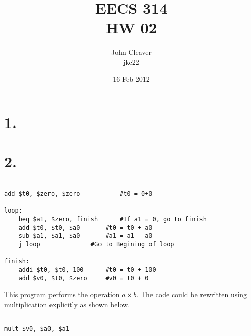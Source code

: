\documentclass[12pt]{article}
\title{EECS 314 \\ HW 02}
\author{John Cleaver \\ jkc22}
\date{16 Feb 2012}
\begin{document}
\lstset{language=[mips]Assembler}
\maketitle

\section*{1.}



\section*{2.}

\begin{lstlisting}

add $t0, $zero, $zero 			#t0 = 0+0

loop:
	beq $a1, $zero, finish 		#If a1 = 0, go to finish
	add $t0, $t0, $a0 		#t0 = t0 + a0
	sub $a1, $a1, $a0 		#a1 = a1 - a0
	j loop				#Go to Begining of loop

finish:
	addi $t0, $t0, 100		#t0 = t0 + 100
	add $v0, $t0, $zero		#v0 = t0 + 0

\end{lstlisting}

This program performs the operation $a \times b$. The code could be rewritten using multiplication explicitly as shown below.

\begin{lstlisting}

mult $v0, $a0, $a1

\end{lstlisting}
\end{document}
